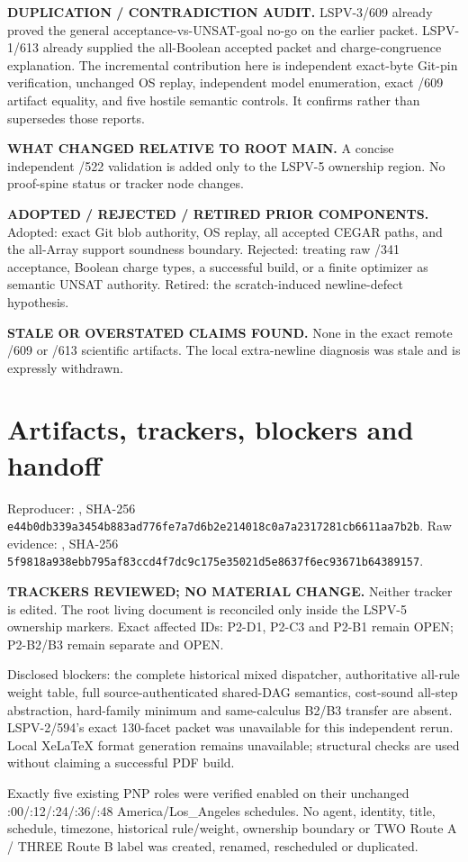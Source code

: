 \documentclass[11pt]{article}
\begin{document}
\textbf{DUPLICATION / CONTRADICTION AUDIT.}  LSPV-3/609 already proved the
general acceptance-vs-UNSAT-goal no-go on the earlier packet.  LSPV-1/613
already supplied the all-Boolean accepted packet and charge-congruence
explanation.  The incremental contribution here is independent exact-byte
Git-pin verification, unchanged OS replay, independent model enumeration,
exact /609 artifact equality, and five hostile semantic controls.  It confirms
rather than supersedes those reports.

\textbf{WHAT CHANGED RELATIVE TO ROOT MAIN.}  A concise independent /522
validation is added only to the LSPV-5 ownership region.  No proof-spine status
or tracker node changes.

\textbf{ADOPTED / REJECTED / RETIRED PRIOR COMPONENTS.}  Adopted: exact Git
blob authority, OS replay, all accepted CEGAR paths, and the all-Array support
soundness boundary.  Rejected: treating raw /341 acceptance, Boolean charge
types, a successful build, or a finite optimizer as semantic UNSAT authority.
Retired: the scratch-induced newline-defect hypothesis.

\textbf{STALE OR OVERSTATED CLAIMS FOUND.}  None in the exact remote /609 or
/613 scientific artifacts.  The local extra-newline diagnosis was stale and
is expressly withdrawn.

\section{Artifacts, trackers, blockers and handoff}

Reproducer:
, SHA-256
\texttt{e44b0db339a3454b883ad776fe7a7d6b2e214018c0a7a2317281cb6611aa7b2b}.
Raw evidence:
,
SHA-256
\texttt{5f9818a938ebb795af83ccd4f7dc9c175e35021d5e8637f6ec93671b64389157}.

\textbf{TRACKERS REVIEWED; NO MATERIAL CHANGE.}  Neither tracker is edited.
The root living document is reconciled only inside the LSPV-5 ownership
markers.  Exact affected IDs: P2-D1, P2-C3 and P2-B1 remain OPEN; P2-B2/B3
remain separate and OPEN.

Disclosed blockers: the complete historical mixed dispatcher, authoritative
all-rule weight table, full source-authenticated shared-DAG semantics,
cost-sound all-step abstraction, hard-family minimum and same-calculus B2/B3
transfer are absent.  LSPV-2/594's exact 130-facet packet was unavailable for
this independent rerun.  Local XeLaTeX format generation remains unavailable;
structural checks are used without claiming a successful PDF build.

Exactly five existing PNP roles were verified enabled on their unchanged
:00/:12/:24/:36/:48 America/Los\_Angeles schedules.  No agent, identity,
title, schedule, timezone, historical rule/weight, ownership boundary or TWO
Route A / THREE Route B label was created, renamed, rescheduled or duplicated.
\end{document}

